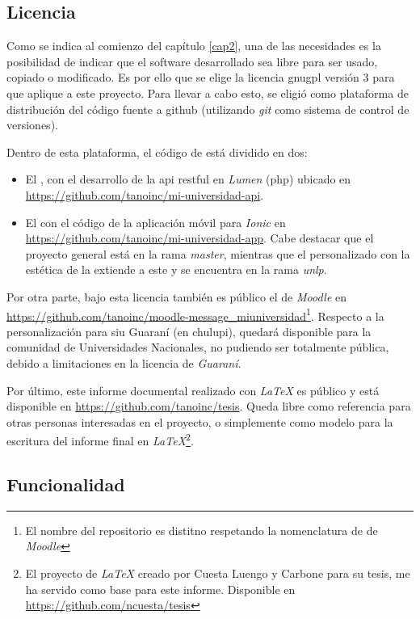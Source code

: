 \subsection{Licencia}
\label{licencia}

Como se indica al comienzo del capítulo \ref{cap2}, una de las necesidades es la posibilidad de indicar que el software desarrollado sea libre para ser usado, copiado o modificado. Es por ello que se elige la licencia \gls{gnugpl} versión 3 para que aplique a este proyecto. Para llevar a cabo esto, se eligió como plataforma de distribución del código fuente a \gls{github} (utilizando \textit{git} como sistema de control de versiones).

Dentro de esta plataforma, el código de \nombreApp{} está dividido en dos:
\begin{itemize}
\item El , con el desarrollo de la \gls{api} \gls{restful} en \textit{Lumen} (\gls{php}) ubicado en \url{https://github.com/tanoinc/mi-universidad-api}.
\item El  con el código de la aplicación móvil para \textit{Ionic} en \url{https://github.com/tanoinc/mi-universidad-app}. Cabe destacar que el proyecto general está en la rama \textit{master}, mientras que el personalizado con la estética de la \unlp{} extiende a este y se encuentra en la rama \textit{unlp}.
\end{itemize}

Por otra parte, bajo esta licencia también es público el  de \textit{Moodle} en \url{https://github.com/tanoinc/moodle-message_miuniversidad}\footnote{El nombre del repositorio es distitno respetando la nomenclatura de  de \textit{Moodle}}.
Respecto a la personalización para \gls{siu} Guaraní (en \gls{chulupi}), quedará disponible para la comunidad de Universidades Nacionales, no pudiendo ser totalmente pública, debido a limitaciones en la licencia de \textit{Guaraní}.

Por último, este informe documental realizado con \textit{LaTeX} es público y está disponible en \url{https://github.com/tanoinc/tesis}. Queda libre como referencia para otras personas interesadas en el proyecto, o simplemente como modelo para la escritura del informe final en \textit{LaTeX}\footnote{El proyecto de \textit{LaTeX} creado por Cuesta Luengo y Carbone para su tesis, me ha servido como base para este informe. Disponible en \url{https://github.com/ncuesta/tesis}}.

\subsection{Funcionalidad}
\label{funcionalidad}


